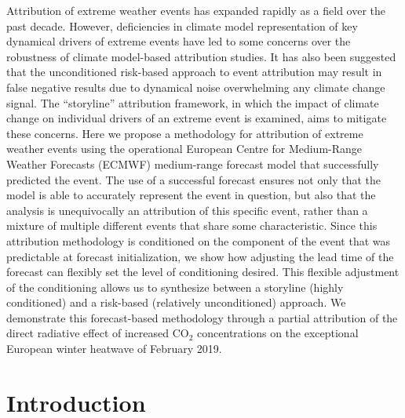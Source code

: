   Attribution of extreme weather events has expanded rapidly as a field over the past decade. However, deficiencies in climate model representation of key dynamical drivers of extreme events have led to some concerns over the robustness of climate model-based attribution studies. It has also been suggested that the unconditioned risk-based approach to event attribution may result in false negative results due to dynamical noise overwhelming any climate change signal. The “storyline” attribution framework, in which the impact of climate change on individual drivers of an extreme event is examined, aims to mitigate these concerns. Here we propose a methodology for attribution of extreme weather events using the operational European Centre for Medium-Range Weather Forecasts (ECMWF) medium-range forecast model that successfully predicted the event. The use of a successful forecast ensures not only that the model is able to accurately represent the event in question, but also that the analysis is unequivocally an attribution of this specific event, rather than a mixture of multiple different events that share some characteristic. Since this attribution methodology is conditioned on the component of the event that was predictable at forecast initialization, we show how adjusting the lead time of the forecast can flexibly set the level of conditioning desired. This flexible adjustment of the conditioning allows us to synthesize between a storyline (highly conditioned) and a risk-based (relatively unconditioned) approach. We demonstrate this forecast-based methodology through a partial attribution of the direct radiative effect of increased CO$_2$ concentrations on the exceptional European winter heatwave of February 2019.

\section{Introduction}

